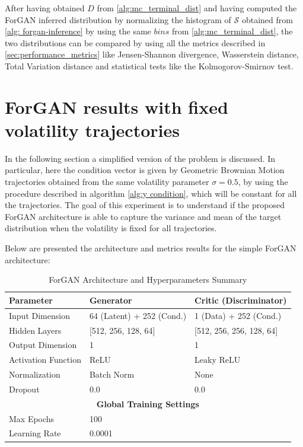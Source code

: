 After having obtained $D$ from \ref{alg:mc_terminal_dist} and having computed the ForGAN inferred distribution by normalizing the histogram of $\mathcal{S}$ obtained from \ref{alg: forgan-inference} by using the same $bins$ from \ref{alg:mc_terminal_dist},
the two distributions can be compared by using all the metrics described in \ref{sec:performance_metrics} like Jensen-Shannon divergence, Wasserstein distance, Total Variation distance and statistical tests like the Kolmogorov-Smirnov test.


\section{ForGAN results with fixed volatility trajectories}
In the following section a simplified version of the problem is discussed.
In particular, here the condition vector is given by Geometric Brownian Motion trajectories
obtained from the same volatility parameter $\sigma = 0.5$, by using the procedure described in algorithm \ref{alg:y condition},
which will be constant for all 
the trajectories.
The goal of this experiment is to understand if the proposed ForGAN architecture is able to capture the variance and mean of the target distribution when the volatility is fixed for all trajectories.

Below are presented the architecture and metrics results for the simple ForGAN architecture:
\begin{table}[H] 
\centering
\caption{ForGAN Architecture and Hyperparameters Summary}
\label{tab:forgan_debug_architecture}
\begin{tabular}{lll}
\hline
\textbf{Parameter}         & \textbf{Generator}          & \textbf{Critic (Discriminator)} \\ \hline
Input Dimension            & 64 (Latent) + 252 (Cond.)   & 1 (Data) + 252 (Cond.)          \\
Hidden Layers              & [512, 256, 128, 64]         & [512, 256, 256, 128, 64]        \\
Output Dimension           & 1                           & 1                               \\
Activation Function        & ReLU                        & Leaky ReLU                      \\
Normalization              & Batch Norm                  & None                      \\
Dropout                    & 0.0                         & 0.0                             \\
\multicolumn{3}{c}{\textbf{Global Training Settings}}                                     \\ \hline
Max Epochs                 & \multicolumn{2}{l}{100}                                       \\
Learning Rate              & \multicolumn{2}{l}{0.0001}                                      \\
\end{tabular}
\end{table}

